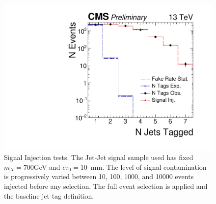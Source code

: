\begin{figure}
\begin{center}
\includegraphics[width=.45\textwidth]{figures/an/ANALYSIS/76x_pu/INJECTION/qcd_loose_displacedEvtSel_10000eV.pdf}
\caption{Signal Injection tests. The Jet-Jet signal sample used has fixed $m_X=700$GeV and $c\tau_0=10$~mm. The
level of signal contamination is progressively varied between 10, 100, 1000, and 10000 events injected before any selection. The full 
event selection is applied and the baseline jet tag definition. \label{fig:injection_700_10mm}}
\end{center}
\end{figure}
